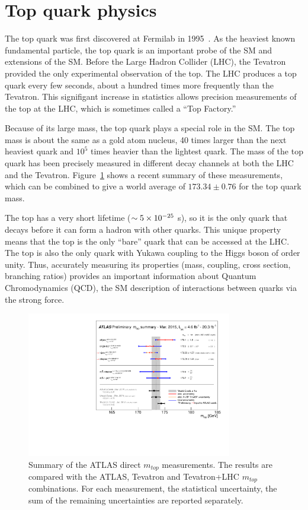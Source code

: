 \section{Top quark physics}
The top quark was first discovered at Fermilab in 1995~\cite{Abe:1995hr}\cite{Abachi:1995iq}. As the heaviest known fundamental particle, the top quark is an important probe of the SM and extensions of the SM. Before the Large Hadron Collider (LHC), the Tevatron provided the only experimental observation of the top. The LHC produces a top quark every few seconds, about a hundred times more frequently than the Tevatron. This signifigant increase in statistics allows precision measurements of the top at the LHC, which is sometimes called a ``Top Factory.'' 

Because of its large mass, the top quark plays a special role in the SM. The top mass is about the same as a gold atom nucleus, 40 times larger than the next heaviest quark and $10^5$ times heavier than the lightest quark. The mass of the top quark has been precisely measured in different decay channels at both the LHC and the Tevatron. Figure~\ref{fig:topmass} shows a recent summary of these measurements, which can be combined to give a world average of $173.34 \pm 0.76$ for the top quark mass.

 The top has a very short lifetime ($\sim 5 \times 10^{-25}$ s), so it is the only quark that decays before it can form a hadron with other quarks. This unique property means that the top is the only ``bare'' quark that can be accessed at the LHC. The top is also the only quark with Yukawa coupling to the Higgs boson of order unity. Thus, accurately measuring its properties (mass, coupling, cross section, branching ratios) provides an important information about Quantum Chromodynamics (QCD), the SM description of interactions between quarks via the strong force. 



\begin{figure}
\centering
\includegraphics[width=0.8\textwidth]{fig/thry/mtopSummaryAll.pdf}
\caption{Summary of the ATLAS direct $m_{top}$ measurements. The results are compared with the ATLAS, Tevatron and Tevatron+LHC $m_{top}$ combinations. For each measurement, the statistical uncertainty, the sum of the remaining uncertainties are reported separately.}
\label{fig:topmass}
\end{figure}

